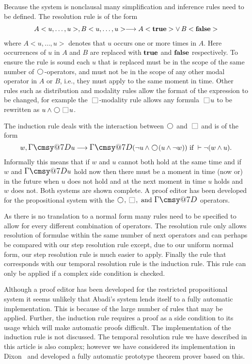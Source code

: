 \documentclass[nohyperref]{acmtrans2f}
\makeatletter
\def\sometime{\mathord{\hbox{\large$\mathchar"0\cmsy@7D$}}}
\newcommand{\always}{\raisebox{-.2ex}{
                           \mbox{\unitlength=0.9ex
                           \begin{picture}(2,2)
                           \linethickness{0.06ex}
                           \put(0,0){\line(1,0){2}}
                           \put(0,2){\line(1,0){2}}
                           \put(0,0){\line(0,1){2}}
                           \put(2,0){\line(0,1){2}}
                           \end{picture}}}
                          \,}
\newcommand{\next}{\!\raisebox{-.2ex}{ %
                        \mbox{\unitlength=0.9ex
                        \begin{picture}(2,2)
                        \linethickness{0.06ex}
                        \put(1,1){\circle{2}} %
                        \end{picture}}}       %
                        \,}
\def\ltrue{\hbox{\rm\bf true}}
\def\lfalse{\hbox{\rm\bf false}}
\makeatother
\begin{document}
Because the system is nonclausal many simplification and inference rules
need to be defined. The resolution rule is of the form
\begin{displaymath}
A <u, \ldots, u>, B <u, \ldots, u> \longrightarrow A <\ltrue> \lor \, B <\lfalse>
\end{displaymath}
where $A <u, \ldots, u>$ denotes that $u$ occurs one or more times in
$A$. Here occurrences of $u$ in $A$ and $B$ are replaced with $\ltrue$ and
$\lfalse$ respectively. To ensure the rule is sound each $u$ that is replaced
must be in the scope of the same number of $\next$-operators, and must
not be in the scope of any other modal operator in $A$ or $B$, i.e., they
must apply to the same moment in time. 
%
Other rules such as distribution and modality rules allow the format of the
expression to be changed, for example the $\always$-modality rule allows
any formula $\always u$ to be rewritten as $u \land \next \always u$.

The induction
rule deals with the interaction between $\next$ and $\always$ and is of the
form 
$$ 
w, \sometime u \longrightarrow \sometime(\neg u \land \next(u \land \neg w))
\mbox{ if } \vdash \neg (w \land u).
$$
Informally this means that if $w$ and $u$ cannot both hold at the same time
and if $w$ and $\sometime u$ hold now then there must be a moment in time
(now or) in the future when $u$ does not hold and at the next moment in
time $u$ holds and $w$ does not.
%
Both systems are shown complete.
A proof editor has been developed for the propositional system with the
$\next, \always, \mbox{ and }
\sometime$ operators. 

As there is no translation to a normal form many rules need to be specified
to allow for every different combination of operators. The resolution rule
only allows resolution of formulae within the same number of next operators
and can perhaps be compared with our step resolution rule except, due to our
uniform normal form, our step resolution rule is much easier to
apply. Finally the rule that corresponds with our temporal resolution rule
is the induction rule. This rule can only be applied if a complex side
condition is checked.

Although a proof editor has been developed for the restricted propositional
system it seems unlikely that Abadi's system lends itself to a fully automatic
implementation. This is because of the large number of rules that may be
applied. Further, the induction rule requires a proof as a side condition
to its usage which will make automatic proofs difficult.  The
implementation of the induction rule is not discussed. The temporal
resolution rule we have described in this article is also complex; 
however we have considered its implementation in
Dixon~ and developed a fully automatic prototype
theorem prover based on this.
\end{document}
